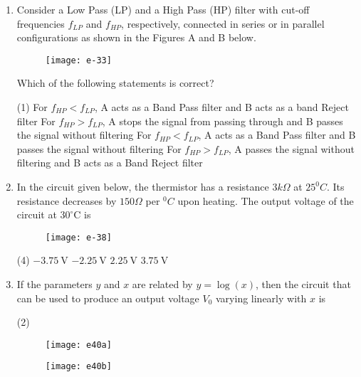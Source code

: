 \begin{enumerate}
\begin{tasks}
\end{tasks}
	\item Consider a Low Pass (LP) and a High Pass (HP) filter with cut-off frequencies $f_{L P}$ and $f_{H P}$, respectively, connected in series or in parallel configurations as shown in the Figures A and B below.\\
	\begin{figure}[H]
		\centering
		\texttt{[image: e-33]}
	\end{figure}
	Which of the following statements is correct?
{	}
\begin{tasks}(1)
\task[\textbf{A.}] For $f_{H P}<f_{L P}$, A acts as a Band Pass filter and B acts as a band Reject filter
\task[\textbf{B.}] For $f_{H P}>f_{L P}$, A stops the signal from passing through and B passes the signal without filtering
\task[\textbf{C.}] For $f_{H P}<f_{L P}$, A acts as a Band Pass filter and B passes the signal without filtering
\task[\textbf{D.}] For $f_{H P}>f_{L P}$, A passes the signal without filtering and B acts as a Band Reject filter
\end{tasks}
	\item In the circuit given below, the thermistor has a resistance $3 k \Omega$ at $25^{0} C$. Its resistance decreases by $150 \Omega$ per ${ }^{0} C$ upon heating. The output voltage of the circuit at $30^{\circ} \mathrm{C}$ is
{	}
\begin{figure}[H]
\centering
\texttt{[image: e-38]}
\end{figure}
\begin{tasks}(4)
\task[\textbf{A.}] $-3.75 \mathrm{~V}$
\task[\textbf{B.}] $-2.25 \mathrm{~V}$
\task[\textbf{C.}] $2.25 \mathrm{~V}$
\task[\textbf{D.}] $3.75 \mathrm{~V}$
\end{tasks}
	\item If the parameters $y$ and $x$ are related by $y=\log (x)$, then the circuit that can be used to produce an output voltage $V_{0}$ varying linearly with $x$ is
	{}
\begin{tasks}(2)
\task[\textbf{A.}] \begin{figure}[H]
	\centering
	\texttt{[image: e40a]}
\end{figure}
\task[\textbf{B.}] \begin{figure}[H]
	\centering
	\texttt{[image: e40b]}
\end{figure}
\task[\textbf{C.}] \begin{figure}[H]

\end{figure}
\end{tasks}
\end{enumerate}
